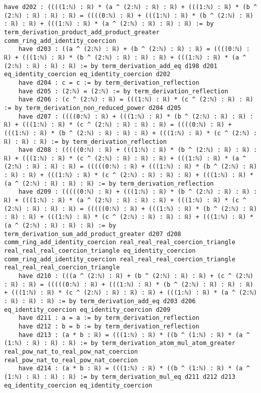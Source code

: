 \documentclass{article}
\begin{document}
\begin{tcolorbox}[colback=white!10, width=\linewidth]
\begin{lstlisting}[language=Lean4]
    have d202 : ((((1:ℕ) : ℝ) * (a ^ (2:ℕ) : ℝ) : ℝ) + (((1:ℕ) : ℝ) * (b ^ (2:ℕ) : ℝ) : ℝ) : ℝ) = ((((0:ℕ) : ℝ) + (((1:ℕ) : ℝ) * (b ^ (2:ℕ) : ℝ) : ℝ) : ℝ) + (((1:ℕ) : ℝ) * (a ^ (2:ℕ) : ℝ) : ℝ) : ℝ) := by term_derivation_product_add_product_greater comm_ring_add_identity_coercion
    have d203 : ((a ^ (2:ℕ) : ℝ) + (b ^ (2:ℕ) : ℝ) : ℝ) = ((((0:ℕ) : ℝ) + (((1:ℕ) : ℝ) * (b ^ (2:ℕ) : ℝ) : ℝ) : ℝ) + (((1:ℕ) : ℝ) * (a ^ (2:ℕ) : ℝ) : ℝ) : ℝ) := by term_derivation_add_eq d198 d201 eq_identity_coercion eq_identity_coercion d202
    have d204 : c = c := by term_derivation_reflection
    have d205 : (2:ℕ) = (2:ℕ) := by term_derivation_reflection
    have d206 : (c ^ (2:ℕ) : ℝ) = (((1:ℕ) : ℝ) * (c ^ (2:ℕ) : ℝ) : ℝ) := by term_derivation_non_reduced_power d204 d205
    have d207 : ((((0:ℕ) : ℝ) + (((1:ℕ) : ℝ) * (b ^ (2:ℕ) : ℝ) : ℝ) : ℝ) + (((1:ℕ) : ℝ) * (c ^ (2:ℕ) : ℝ) : ℝ) : ℝ) = ((((0:ℕ) : ℝ) + (((1:ℕ) : ℝ) * (b ^ (2:ℕ) : ℝ) : ℝ) : ℝ) + (((1:ℕ) : ℝ) * (c ^ (2:ℕ) : ℝ) : ℝ) : ℝ) := by term_derivation_reflection
    have d208 : (((((0:ℕ) : ℝ) + (((1:ℕ) : ℝ) * (b ^ (2:ℕ) : ℝ) : ℝ) : ℝ) + (((1:ℕ) : ℝ) * (c ^ (2:ℕ) : ℝ) : ℝ) : ℝ) + (((1:ℕ) : ℝ) * (a ^ (2:ℕ) : ℝ) : ℝ) : ℝ) = (((((0:ℕ) : ℝ) + (((1:ℕ) : ℝ) * (b ^ (2:ℕ) : ℝ) : ℝ) : ℝ) + (((1:ℕ) : ℝ) * (c ^ (2:ℕ) : ℝ) : ℝ) : ℝ) + (((1:ℕ) : ℝ) * (a ^ (2:ℕ) : ℝ) : ℝ) : ℝ) := by term_derivation_reflection
    have d209 : (((((0:ℕ) : ℝ) + (((1:ℕ) : ℝ) * (b ^ (2:ℕ) : ℝ) : ℝ) : ℝ) + (((1:ℕ) : ℝ) * (a ^ (2:ℕ) : ℝ) : ℝ) : ℝ) + (((1:ℕ) : ℝ) * (c ^ (2:ℕ) : ℝ) : ℝ) : ℝ) = (((((0:ℕ) : ℝ) + (((1:ℕ) : ℝ) * (b ^ (2:ℕ) : ℝ) : ℝ) : ℝ) + (((1:ℕ) : ℝ) * (c ^ (2:ℕ) : ℝ) : ℝ) : ℝ) + (((1:ℕ) : ℝ) * (a ^ (2:ℕ) : ℝ) : ℝ) : ℝ) := by term_derivation_sum_add_product_greater d207 d208 comm_ring_add_identity_coercion real_real_real_coercion_triangle real_real_real_coercion_triangle eq_identity_coercion comm_ring_add_identity_coercion real_real_real_coercion_triangle real_real_real_coercion_triangle
    have d210 : (((a ^ (2:ℕ) : ℝ) + (b ^ (2:ℕ) : ℝ) : ℝ) + (c ^ (2:ℕ) : ℝ) : ℝ) = (((((0:ℕ) : ℝ) + (((1:ℕ) : ℝ) * (b ^ (2:ℕ) : ℝ) : ℝ) : ℝ) + (((1:ℕ) : ℝ) * (c ^ (2:ℕ) : ℝ) : ℝ) : ℝ) + (((1:ℕ) : ℝ) * (a ^ (2:ℕ) : ℝ) : ℝ) : ℝ) := by term_derivation_add_eq d203 d206 eq_identity_coercion eq_identity_coercion d209
    have d211 : a = a := by term_derivation_reflection
    have d212 : b = b := by term_derivation_reflection
    have d213 : (a * b : ℝ) = (((1:ℕ) : ℝ) * ((b ^ (1:ℕ) : ℝ) * (a ^ (1:ℕ) : ℝ) : ℝ) : ℝ) := by term_derivation_atom_mul_atom_greater real_pow_nat_to_real_pow_nat_coercion real_pow_nat_to_real_pow_nat_coercion
    have d214 : (a * b : ℝ) = (((1:ℕ) : ℝ) * ((b ^ (1:ℕ) : ℝ) * (a ^ (1:ℕ) : ℝ) : ℝ) : ℝ) := by term_derivation_mul_eq d211 d212 d213 eq_identity_coercion eq_identity_coercion

\end{lstlisting}
\end{tcolorbox}
\end{document}
